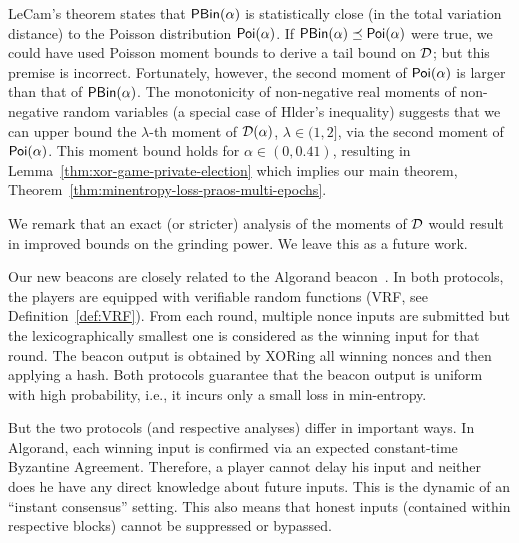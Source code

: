     LeCam's theorem states that $\mathsf{PBin}(\alpha)$ is 
    statistically close (in the total variation distance) 
    to the Poisson distribution $\mathsf{Poi}(\alpha)$. 
    If $\mathsf{PBin}(\alpha) \preceq \mathsf{Poi}(\alpha)$ were true, 
    we could have used Poisson moment bounds to 
    derive a tail bound on $\mathcal{D}$; 
    but this premise is incorrect. 
    Fortunately, however, 
    the second moment of $\mathsf{Poi}(\alpha)$ 
    is larger than that of $\mathsf{PBin}(\alpha)$.
    The monotonicity of non-negative real moments 
    of non-negative random variables
    (a special case of Hlder's inequality) 
    suggests that 
    we can upper bound the $\lambda$-th moment of $\mathcal{D}(\alpha)$, 
    $\lambda \in (1,2]$, via the second moment of $\mathsf{Poi}(\alpha)$. 
    This moment bound holds for $\alpha \in (0, 0.41)$, 
    resulting in Lemma~\ref{thm:xor-game-private-election} 
    which implies our main theorem, 
    Theorem~\ref{thm:minentropy-loss-praos-multi-epochs}.


    We remark that an exact (or stricter) analysis of 
    the moments of $\mathcal{D}$ 
    would result in improved bounds on the grinding power. 
    We leave this as a future work.



        Our new beacons are closely related to the Algorand beacon~\cite{Algorand}. 
        In both protocols, 
        the players are equipped with verifiable
        random functions (VRF, see Definition~\ref{def:VRF}). 
        From each round, multiple nonce inputs are submitted 
        but the lexicographically smallest one is considered as the winning input for that round.
        The beacon output is obtained by XORing all winning nonces and then applying a hash. 
        Both protocols guarantee that the beacon output 
        is uniform with high probability, i.e., 
        it incurs only a small loss in min-entropy. 

        But the two protocols (and respective analyses) differ in important ways. 
        In Algorand, each winning input is confirmed via 
        an expected constant-time Byzantine Agreement. 
        Therefore, 
        a player cannot delay his input and neither does he have any direct knowledge 
        about future inputs. 
        This is the dynamic of an ``instant consensus'' setting. 
        This also means that honest inputs (contained within respective blocks) 
        cannot be suppressed or bypassed.

